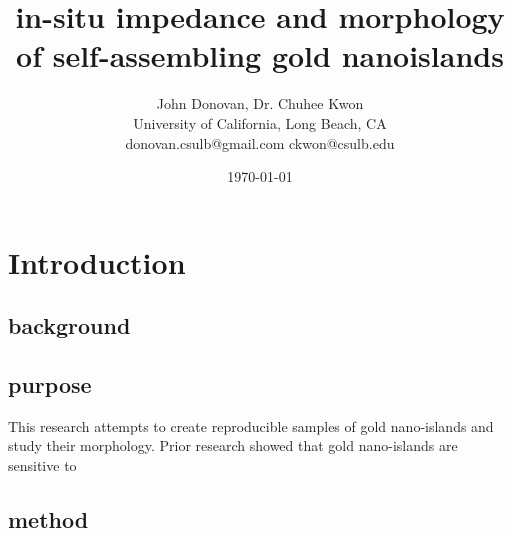 \documentclass[12pt,oneside,english]{article}
\begin{document}
\sffamily

        \title{in-situ impedance and morphology of self-assembling gold nanoislands}

	\author{John Donovan, Dr. Chuhee Kwon\\
	University of California, Long Beach, CA\\
	{\small donovan.csulb@gmail.com ckwon@csulb.edu}}
	
        \date{\today}

	\maketitle


        \section{Introduction}
	\subsection{background}
	\subsection{purpose}
	This research attempts to create reproducible samples of gold nano-islands and study their morphology.  Prior research showed that gold nano-islands are sensitive to 
	\subsection{method}
\end{document}
